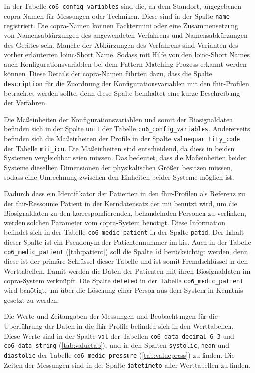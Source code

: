 In der Tabelle \texttt{co6\_config\_variables} sind die, an dem Standort, angegebenen \ac{copra}-Namen für Messungen oder Techniken. Diese sind in der Spalte \texttt{name} registriert. Die \ac{copra}-Namen können Fachtermini oder eine Zusammensetzung von Namensabkürzungen des angewendeten Verfahrens und Namensabkürzungen des Gerätes sein. Manche der Abkürzungen des Verfahrens sind Varianten des vorher erläuterten \ac{loinc}-\glqq Short Name\grqq{}. Sodass mit Hilfe von den \ac{loinc}-\glqq Short Names\grqq{} auch Konfigurationsvariablen bei dem Pattern Matching Prozess erkannt werden können. Diese Details der \ac{copra}-Namen führten dazu, dass die Spalte \texttt{description} für die Zuordnung der Konfigurationsvariablen mit den \ac{fhir}-Profilen betrachtet werden sollte, denn diese Spalte beinhaltet eine kurze Beschreibung der Verfahren.

Die Maßeinheiten der Konfigurationsvariablen und somit der Biosignaldaten befinden sich in der Spalte \texttt{unit} der Tabelle \texttt{co6\_config\_variables}. Andererseits befinden sich die Maßeinheiten der Profile in der Spalte \texttt{valuequan tity\_code} der Tabelle \texttt{mii\_icu}. Die Maßeinheiten sind entscheidend, da diese in beiden Systemen vergleichbar seien müssen. Das bedeutet, dass die Maßeinheiten beider Systeme dieselben Dimensionen der physikalischen Größen besitzen müssen, sodass eine Umrechnung zwischen den Einheiten beider Systeme möglich ist.

Dadurch dass ein Identifikator der Patienten in den \ac{fhir}-Profilen als Referenz zu der \ac{fhir}-Ressource \glqq Patient\grqq{} in der Kerndatensatz der \ac{mii} benutzt wird, um die Biosignaldaten zu den korrespondierenden, behandelnden Personen zu verlinken, werden solchen Parameter vom \ac{copra}-System benötigt. Diese Information befindet sich in der Tabelle \texttt{co6\_medic\_patient} in der Spalte \texttt{patid}. Der Inhalt dieser Spalte ist ein Pseudonym der Patientennummer im \ac{kis}. Auch in der Tabelle \texttt{co6\_medic\_patient} (\ref{tab:patient}) soll  die Spalte \texttt{id} berücksichtigt werden, denn diese ist der primäre Schlüssel dieser Tabelle und ist somit Fremdschlüssel in den Werttabellen. Damit werden die Daten der Patienten mit ihren Biosignaldaten im \ac{copra}-System verknüpft. Die Spalte \texttt{deleted} in der Tabelle \texttt{co6\_medic\_patient} wird benötigt, um über die Löschung einer Person aus dem System in Kenntnis gesetzt zu werden.

Die Werte und Zeitangaben der Messungen und Beobachtungen für die Überführung der Daten in die \ac{fhir}-Profile befinden sich in den Werttabellen. Diese Werte sind in der Spalte \texttt{val} der Tabellen \texttt{co6\_data\_decimal\_6\_3} und \texttt{co6\_data\_string} (\ref{tab:valuetab}), und in den Spalten \texttt{systolic}, \texttt{mean} und \texttt{diastolic} der Tabelle \texttt{co6\_medic\_pressure} (\ref{tab:valuepress}) zu finden. Die Zeiten der Messungen sind in der Spalte \texttt{datetimeto} aller Werttabellen zu finden.

